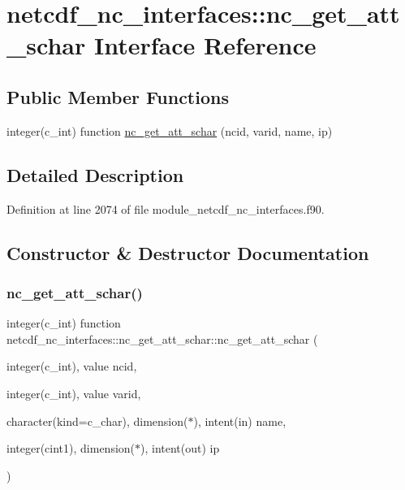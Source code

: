 \hypertarget{interfacenetcdf__nc__interfaces_1_1nc__get__att__schar}{}\section{netcdf\+\_\+nc\+\_\+interfaces\+:\+:nc\+\_\+get\+\_\+att\+\_\+schar Interface Reference}
\label{interfacenetcdf__nc__interfaces_1_1nc__get__att__schar}
\subsection*{Public Member Functions}
\begin{DoxyCompactItemize}
\item 
integer(c\+\_\+int) function \hyperlink{interfacenetcdf__nc__interfaces_1_1nc__get__att__schar_a701d1c016d3b443898c7c9aa1e20e3c8}{nc\+\_\+get\+\_\+att\+\_\+schar} (ncid, varid, name, ip)
\end{DoxyCompactItemize}


\subsection{Detailed Description}


Definition at line 2074 of file module\+\_\+netcdf\+\_\+nc\+\_\+interfaces.\+f90.



\subsection{Constructor \& Destructor Documentation}
\mbox{\label{interfacenetcdf__nc__interfaces_1_1nc__get__att__schar_a701d1c016d3b443898c7c9aa1e20e3c8}} 
\subsubsection{\texorpdfstring{nc\+\_\+get\+\_\+att\+\_\+schar()}{nc\_get\_att\_schar()}}
{\footnotesize\ttfamily integer(c\+\_\+int) function netcdf\+\_\+nc\+\_\+interfaces\+::nc\+\_\+get\+\_\+att\+\_\+schar\+::nc\+\_\+get\+\_\+att\+\_\+schar (\begin{DoxyParamCaption}\item[{integer(c\+\_\+int), value}]{ncid,  }\item[{integer(c\+\_\+int), value}]{varid,  }\item[{character(kind=c\+\_\+char), dimension($\ast$), intent(in)}]{name,  }\item[{integer(cint1), dimension($\ast$), intent(out)}]{ip }\end{DoxyParamCaption})}



